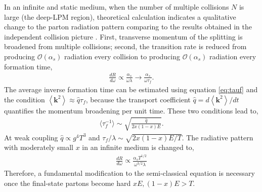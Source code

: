 \documentclass[aps, prc, reprint, amsmath, groupedaddress, nofootinbib]{revtex4-1}
\begin{document}
In an infinite and static medium, when the number of multiple collisions $N$ is large (the deep-LPM region), theoretical calculation indicates a qualitative change to the parton radiation pattern comparing to the results obtained in the independent collision picture \cite{Baier:1996kr}.
First, transverse momentum of the splitting is broadened from multiple collisions; second, the transition rate is reduced from producing $\mathcal{O}(\alpha_s)$ radiation every collision to producing $\mathcal{O}(\alpha_s)$ radiation every formation time,
\begin{eqnarray}
\frac{dR}{d\omega} \propto \frac{\alpha_s}{\omega\lambda} \rightarrow \frac{\alpha_s}{\omega\tau_f}.
\end{eqnarray}
The average inverse formation time can be estimated using equation \ref{eq:tauf} and the condition $\left\langle \mathbf{k}^2 \right\rangle \approx \hat{q} \tau_f$,
because the transport coefficient $\hat{q} = d \left\langle \mathbf{k}^2 \right\rangle / dt$ quantifies the momentum broadening per unit time.
These two conditions lead to,
\begin{eqnarray}
\langle \tau_f^{-1} \rangle \sim \sqrt{\frac{\hat{q}}{2x(1-x)E}}.
\label{eq:tauf-sf}
\end{eqnarray}
At weak coupling $\hat{q}\propto g^4 T^3$ and $\tau_f/\lambda \sim \sqrt{2x(1-x)E/T}$.
The radiative pattern with moderately small $x$ in an infinite medium is changed to,
\begin{eqnarray}
\frac{dR}{d\omega} \propto  \frac{\alpha_s T^{1/2}}{\omega^{3/2}\lambda}
\end{eqnarray}
Therefore, a fundamental modification to the semi-classical equation is necessary once the final-state partons become hard $xE, (1-x)E > T$.
\end{document}

